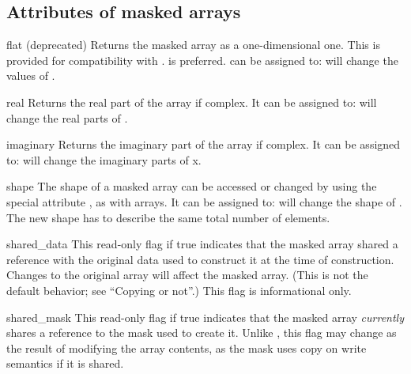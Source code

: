 \subsection{Attributes of masked arrays}
\label{sec:numarray.ma:attr-mask-arrays}

\begin{memberdesc}[MaskedArray]{flat}
   (deprecated) 
   Returns the masked array as a one-dimensional one. This is
   provided for compatibility with \module{\numarray}.  is
   preferred.   can be assigned to:  will
   change the values of .
\end{memberdesc}

\begin{memberdesc}[MaskedArray]{real}
   Returns the real part of the array if complex. It can be assigned to:
    will change the real parts of .
\end{memberdesc}

\begin{memberdesc}[MaskedArray]{imaginary}
   Returns the imaginary part of the array if complex. It can be assigned to:
    will change the imaginary parts of x.
\end{memberdesc}

\begin{memberdesc}[MaskedArray]{shape}
   The shape of a masked array can be accessed or changed by using the special
   attribute , as with \module{\numarray} arrays. It can be
   assigned to:  will change the shape of . The
   new shape has to describe the same total number of elements.
\end{memberdesc}

\begin{memberdesc}[MaskedArray]{shared_data}
   This read-only flag if true indicates that the masked array shared a
   reference with the original data used to construct it at the time of
   construction. Changes to the original array will affect the masked array.
   (This is not the default behavior; see ``Copying or not''.) This flag is
   informational only.
\end{memberdesc}

\begin{memberdesc}[MaskedArray]{shared_mask}
   This read-only flag if true indicates that the masked array \emph{currently}
   shares a reference to the mask used to create it. Unlike
   , this flag may change as the result of modifying the
   array contents, as the mask uses copy on write semantics if it is shared.
\end{memberdesc}



